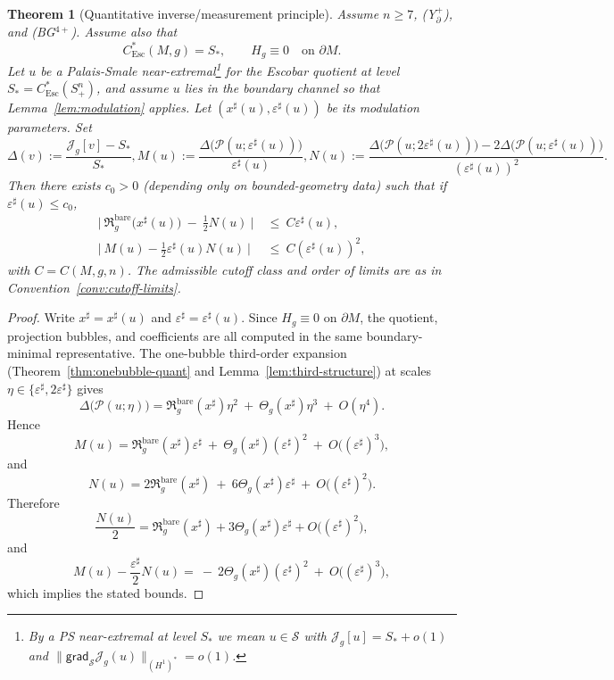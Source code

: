 \documentclass[11pt,reqno,a4paper]{amsart}
\numberwithin{equation}{section}
\theoremstyle{plain}
\newtheorem{theorem}{Theorem}[section]
\theoremstyle{remark}
\theoremstyle{plain}
\begin{document}
\begin{theorem}[Quantitative inverse/measurement principle]\label{thm:inverse-precise}
Assume $n\ge7$, \textup{(Y$^+_{\partial}$)}, and \textup{(BG$^{4+}$)}. Assume also that
\[
C^*_{\mathrm{Esc}}(M,g)=S_\ast,
\qquad
H_g\equiv0\quad\text{on }\partial M.
\]
Let $u$ be a Palais-Smale near-extremal\footnote{By a PS near-extremal at level $S_\ast$ we mean $u\in\mathcal S$ with
$\mathcal J_g[u]=S_\ast+o(1)$ and $\|\mathsf{grad}_{\mathcal S}\mathcal J_g(u)\|_{(H^1)^\ast}=o(1)$.} for the Escobar \emph{quotient} at level $S_\ast=C^*_{\mathrm{Esc}}(S^n_+)$,
and assume $u$ lies in the boundary channel so that Lemma~\ref{lem:modulation} applies.
Let $(x^\sharp(u),\varepsilon^\sharp(u))$ be its modulation parameters. Set
\[
\Delta(v):=\frac{\mathcal J_g[v]-S_\ast}{S_\ast},
M(u):=\frac{\Delta\big(\mathcal P(u;\varepsilon^\sharp(u))\big)}{\varepsilon^\sharp(u)},
N(u):=\frac{\Delta\big(\mathcal P(u;2\varepsilon^\sharp(u))\big)-2\Delta\big(\mathcal P(u;\varepsilon^\sharp(u))\big)}{(\varepsilon^\sharp(u))^2}.
\]
Then there exists $c_0>0$ (depending only on bounded-geometry data) such that if $\varepsilon^\sharp(u)\le c_0$,
\begin{align*}
\Big|\ \mathfrak R_g^{\mathrm{bare}}\big(x^\sharp(u)\big)\ -\ \tfrac12N(u)\ \Big|
&\ \le\ C\varepsilon^\sharp(u),\\
\Big|\ M(u)-\tfrac12\varepsilon^\sharp(u)N(u)\ \Big|
&\ \le\ C(\varepsilon^\sharp(u))^2,
\end{align*}
with $C=C(M,g,n)$. The admissible cutoff class and order of limits are as in Convention~\ref{conv:cutoff-limits}.
\end{theorem}

\begin{proof}
Write $x^\sharp=x^\sharp(u)$ and $\varepsilon^\sharp=\varepsilon^\sharp(u)$.
Since $H_g\equiv0$ on $\partial M$, the quotient, projection bubbles, and
coefficients are all computed in the same boundary-minimal representative.
The one-bubble third-order expansion (Theorem~\ref{thm:onebubble-quant}
and Lemma~\ref{lem:third-structure}) at scales $\eta\in\{\varepsilon^\sharp,2\varepsilon^\sharp\}$ gives
\[
\Delta\big(\mathcal P(u;\eta)\big)
=\mathfrak R_g^{\mathrm{bare}}(x^\sharp)\eta^2\ +\ \Theta_g(x^\sharp)\eta^3\ +\ O(\eta^4).
\]
Hence
\[
M(u)
=\mathfrak R_g^{\mathrm{bare}}(x^\sharp)\varepsilon^\sharp\ +\ \Theta_g(x^\sharp)(\varepsilon^\sharp)^2\ +\ O\big((\varepsilon^\sharp)^3\big),
\]
and
\[
N(u)
=2\mathfrak R_g^{\mathrm{bare}}(x^\sharp)\ +\ 6\Theta_g(x^\sharp)\varepsilon^\sharp\ +\ O\big((\varepsilon^\sharp)^2\big).
\]
Therefore
\[
\frac{N(u)}{2}=\mathfrak R_g^{\mathrm{bare}}(x^\sharp)+3\Theta_g(x^\sharp)\varepsilon^\sharp+O\big((\varepsilon^\sharp)^2\big),
\]
and
\[
M(u)-\frac{\varepsilon^\sharp}{2}N(u)
=\ -\ 2\Theta_g(x^\sharp)(\varepsilon^\sharp)^2\ +\ O\big((\varepsilon^\sharp)^3\big),
\]
which implies the stated bounds.
\end{proof}
\end{document}
